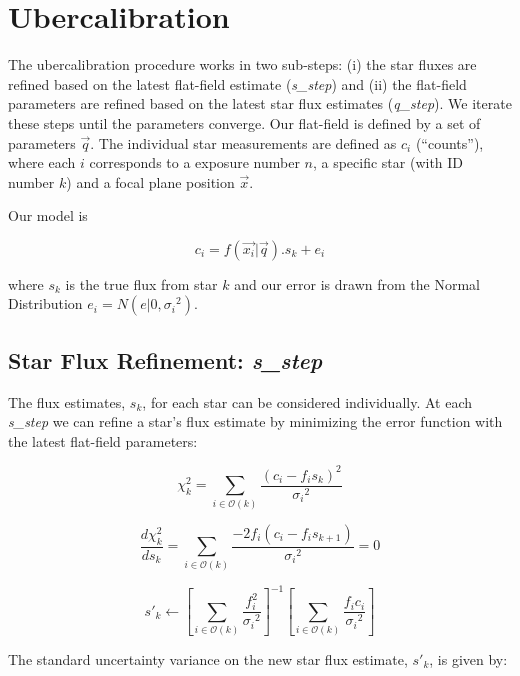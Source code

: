 \documentclass[manuscript]{aastex}
\begin{document}
\section{Ubercalibration}
The ubercalibration procedure works in two sub-steps: (i) the star fluxes are refined based on the latest flat-field estimate (\textit{s\_step}) and (ii) the flat-field parameters are refined based on the latest star flux estimates (\textit{q\_step}). We iterate these steps until the parameters converge. Our flat-field is defined by a set of parameters $\vec{q}$. The individual star measurements are defined as $c_i$ (``counts''), where each $i$ corresponds to a exposure number $n$, a specific star (with ID number $k$) and a focal plane position $\vec{x}$.

Our model is

\begin{displaymath}
c_i = f(\vec{x_i} | \vec{q}) . s_{k} + e_{i}
\end{displaymath}

where $s_k$ is the true flux from star $k$ and our error is drawn from the Normal Distribution $e_{i} = N(e|0,{\sigma_i}^2)$.

\subsection{Star Flux Refinement: \textbf{\textit{s\_step}}}
The flux estimates, $s_k$, for each star can be considered individually. At each \textit{s\_step} we can refine a star's flux estimate by minimizing the error function with the latest flat-field parameters:

\begin{displaymath}
\chi^2_{k} = \sum_{i \in \mathcal{O}(k)} \frac{(c_i-f_{i}s_{k})^2}{{\sigma_i}^2}
\end{displaymath}

\begin{displaymath}
\frac{d\chi^2_{k}}{d s_{k}} = \sum_{i \in \mathcal{O}(k)} \frac{-2 f_{i} (c_i-f_{i}s_{k+1})}{{\sigma_i}^2} = 0
\end{displaymath}

\begin{displaymath}
s'_{k} \leftarrow \left[{\sum_{i \in \mathcal{O}(k)}  \frac{f_{i}^2}{{\sigma_i}^2}} \right]^{-1}  \left[ {\sum_{i \in \mathcal{O}(k)} \frac{f_{i} c_i}{{\sigma_i}^2}} \right]
\end{displaymath}

The standard uncertainty variance on the new star flux estimate, $s'_{k}$, is given by:
\end{document}
